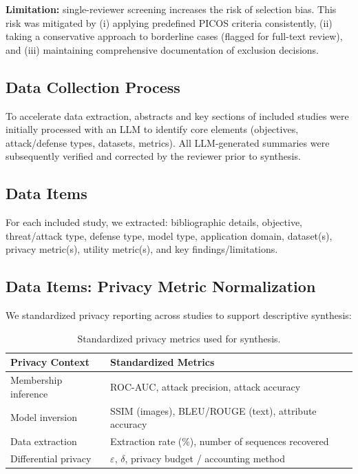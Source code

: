 \documentclass[conference]{IEEEtran}
\begin{document}
\textbf{Limitation:} single-reviewer screening increases the risk of selection bias. This risk was mitigated by (i) applying predefined PICOS criteria consistently, (ii) taking a conservative approach to borderline cases (flagged for full-text review), and (iii) maintaining comprehensive documentation of exclusion decisions.

\subsection{Data Collection Process}
To accelerate data extraction, abstracts and key sections of included studies were initially processed with an LLM to identify core elements (objectives, attack/defense types, datasets, metrics). All LLM-generated summaries were subsequently verified and corrected by the reviewer prior to synthesis.

\subsection{Data Items}
For each included study, we extracted: bibliographic details, objective, threat/attack type, defense type, model type, application domain, dataset(s), privacy metric(s), utility metric(s), and key findings/limitations.

\subsection{Data Items: Privacy Metric Normalization}
We standardized privacy reporting across studies to support descriptive synthesis:
\begin{table}[!t]
\centering
\small
\renewcommand{\arraystretch}{1.05}
\begin{tabular}{L{0.35\columnwidth} L{0.60\columnwidth}}
\toprule
\textbf{Privacy Context} & \textbf{Standardized Metrics} \\
\midrule
Membership inference & ROC-AUC, attack precision, attack accuracy \\
Model inversion & SSIM (images), BLEU/ROUGE (text), attribute accuracy \\
Data extraction & Extraction rate (\%), number of sequences recovered \\
Differential privacy & $\varepsilon$, $\delta$, privacy budget / accounting method \\
\bottomrule
\end{tabular}
\caption{Standardized privacy metrics used for synthesis.}
\label{tab:privacy_metrics}
\end{table}
\end{document}
